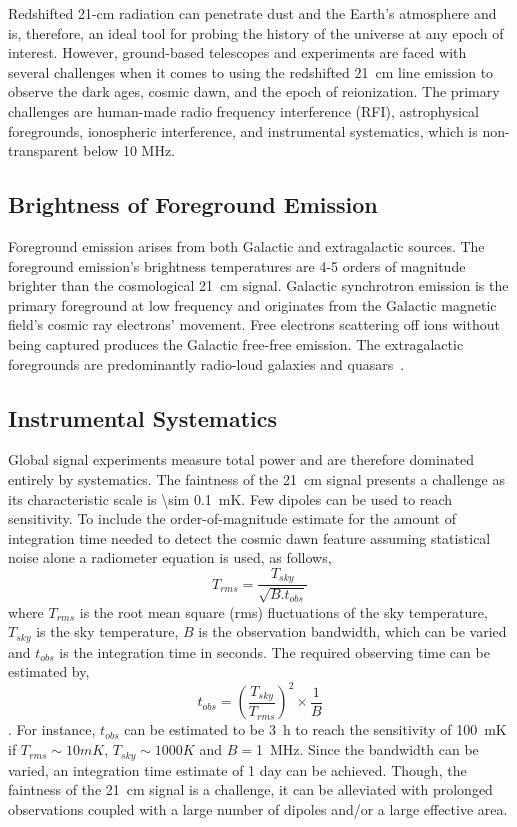 Redshifted 21-cm radiation can penetrate dust and the Earth's atmosphere and is, therefore, an ideal tool for probing the history of the universe at any epoch of interest. However, ground-based telescopes and experiments are faced with several challenges when it comes to using the redshifted \SI{21}{cm} line emission to observe the dark ages, cosmic dawn, and the epoch of reionization. The primary challenges are human-made radio frequency interference (RFI), astrophysical foregrounds, ionospheric interference, and instrumental systematics, which is non-transparent below 10 MHz. 

\subsection*{Brightness of Foreground Emission}

Foreground emission arises from both Galactic and extragalactic sources. The foreground emission's brightness temperatures are 4-5 orders of magnitude brighter than the cosmological \SI{21}{cm} signal. Galactic synchrotron emission is the primary foreground at low frequency and originates from the Galactic magnetic field's cosmic ray electrons' movement. Free electrons scattering off ions without being captured produces the Galactic free-free emission. The extragalactic foregrounds are predominantly radio-loud galaxies and quasars~\citep{2018RAA....18..114H, 2008MNRAS.389.1319J}.

\subsection*{Instrumental Systematics}\label{s:chall}

Global signal experiments measure total power and are therefore dominated entirely by systematics. The faintness of the \SI{21}{\centi \meter} signal presents a challenge as its characteristic scale is \SI{\sim 0.1}{\milli \kelvin}. Few dipoles can be used to reach sensitivity. To include the order-of-magnitude estimate for the amount of integration time needed to detect the cosmic dawn feature assuming statistical noise alone a radiometer equation is used, as follows, 
\begin{equation}
T_{rms} = \frac{T_{sky}}{\sqrt{B. t_{obs}}}
\end{equation}
where $T_{rms}$ is the root mean square (rms) fluctuations of the sky temperature, $T_{sky}$ is the sky temperature, $B$ is the observation bandwidth, which can be varied and $t_{obs}$ is the integration time in seconds. 
The required observing time can be estimated by,
\begin{equation}
t_{obs} = \left ({\frac{T_{sky}}{T_{rms}}} \right )^2 \times \frac{1}{B}
\end{equation}.
For instance, $t_{obs}$ can be estimated to be \SI{3}{\hour} to reach the sensitivity of \SI{100}{\milli \kelvin} if $T_{rms} \sim 10 mK$, $T_{sky} \sim 1000 K$ and $B=$\SI{1}{\mega \hertz}. Since the bandwidth can be varied, an integration time estimate of 1 day can be achieved. Though, the faintness of the \SI{21}{\centi \meter} signal is a challenge, it can be alleviated with prolonged observations coupled with a large number of dipoles and/or a large effective area.

